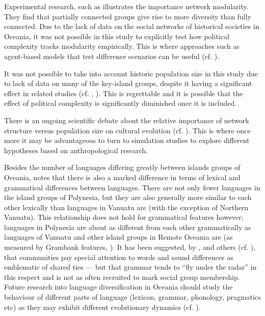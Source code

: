 \documentclass[unnumsec,webpdf,modern,medium]{oup-authoring-template}
\begin{document}
Experimental research, such as \citet{derex2016partial} illustrates the importance network modularity. They find that partially connected groups give rise to more diversity than fully connected. Due to the lack of data on the social networks of historical societies in Oceania, it was not possible in this study to explicitly test how political complexity tracks modularity empirically. This is where approaches such as agent-based models that test difference scenarios can be useful (cf. \citet{reali2014paradox, mann2022cognition}).

It was not possible to take into account historic population size in this study due to lack of data on many of the key-island groups, despite it having a significant effect in related studies (cf. \citet{bromham_polynesian_sizes}, \citet{watts_2018}). This is regrettable and it is possible that the effect of political complexity is significantly diminished once it is included. 

There is an ongoing scientific debate about the relative importance of network structure versus population size on cultural evolution (cf. \citet{raviv2019larger, derex2016partial, milroy1992social, reali2014paradox}). This is where once more it may be advantageous to turn to simulation studies to explore different hypotheses based on anthropological research.

Besides the number of languages differing greatly between islands groups of Oceania, \citet[218-291]{skirgaard2020multilevel} notes that there is also a marked difference in terms of lexical and grammatical differences between languages. There are not only fewer languages in the island groups of Polynesia, but they are also generally more similar to each other lexically than languages in Vanuatu are (with the exception of Northern Vanuatu). This relationship does not hold for grammatical features however; languages in Polynesia are about as different from each other grammatically as languages of Vanuatu and other island groups in Remote Oceania are (as measured by Grambank features, \citep{grambank_release}). It has been suggested, by \citet{silverstein1981limits}, \citet{francois2011} and others (cf. \citet{mansfield2023dialect}), that communities pay special attention to words and sound differences as emblematic of shared ties --- but that grammar tends to ``fly under the radar'' in this respect and is not as often recruited to mark social group membership. Future research into language diversification in Oceania should study the behaviour of different parts of language (lexicon, grammar, phonology, pragmatics etc) as they may exhibit different evolutionary dynamics (cf. \citet{greenhilletal_2017}).
\end{document}
